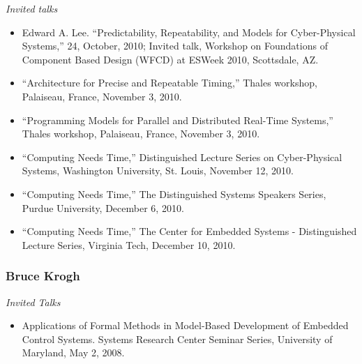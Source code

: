                 \emph{Invited talks}
                 
                 \begin{itemize}
                 \item Edward A. Lee. ``Predictability, Repeatability, and Models for Cyber-Physical Systems,''
                   \cite{Lee10_PredictabilityRepeatabilityModelsForCyberPhysical}
                   24, October, 2010; Invited talk,
                   Workshop on Foundations of Component Based Design (WFCD) at ESWeek 2010, Scottsdale, AZ.

                 \item ``Architecture for Precise and Repeatable Timing,''
                   Thales workshop,  Palaiseau, France, November 3, 2010.

                 \item ``Programming Models for Parallel and Distributed Real-Time Systems,''
                   Thales workshop, Palaiseau, France,  November 3, 2010. 

                 \item ``Computing Needs Time,''   \cite{Lee10_ComputingNeedsTime_WUSTL}
                   Distinguished Lecture Series on Cyber-Physical Systems, Washington University, St. Louis, November 12, 2010.

                 \item ``Computing Needs Time,''   \cite{Lee10_ComputingNeedsTime_Purdue}
                   The Distinguished Systems Speakers Series, Purdue University,
                   December 6, 2010.


                 \item ``Computing Needs Time,''   \cite{Lee10_ComputingNeedsTime_VT}
                   The Center for Embedded Systems - Distinguished Lecture Series,
                   Virginia Tech, December 10, 2010.

                 \end{itemize}

                 \subsubsection{Bruce Krogh}

                 \emph{Invited Talks}

                 \begin{itemize}
                    \item Applications of Formal Methods in Model-Based Development of Embedded Control Systems. Systems Research Center Seminar Series, University of Maryland, May 2, 2008.
                 \end{itemize}

